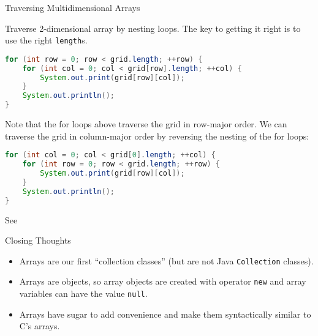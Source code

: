 \documentclass{beamer}
\begin{document}
\begin{frame}[fragile]{Traversing Multidimensional Arrays}


Traverse 2-dimensional array by nesting loops.  The key to getting it right is to use the right {\tt length}s.
\vspace{-.05in}
\begin{lstlisting}[language=Java]
for (int row = 0; row < grid.length; ++row) {
    for (int col = 0; col < grid[row].length; ++col) {
        System.out.print(grid[row][col]);
    }
    System.out.println();
}
\end{lstlisting}
Note that the for loops above traverse the grid in row-major order.  We can traverse the grid in column-major order by reversing the nesting of the for loops:
\vspace{-.05in}
\begin{lstlisting}[language=Java]
for (int col = 0; col < grid[0].length; ++col) {
    for (int row = 0; row < grid.length; ++row) {
        System.out.print(grid[row][col]);
    }
    System.out.println();
}
\end{lstlisting}
\vspace{-.05in}
See 

\end{frame}

\begin{frame}[fragile]{Closing Thoughts}

\begin{itemize}
\item Arrays are our first ``collection classes'' (but are not Java {\tt Collection} classes).
\item Arrays are objects, so array objects are created with operator {\tt new} and array variables can have the value {\tt null}.
\item Arrays have sugar to add convenience and make them syntactically similar to C's arrays.
\end{itemize}


\end{frame}







\end{document}
